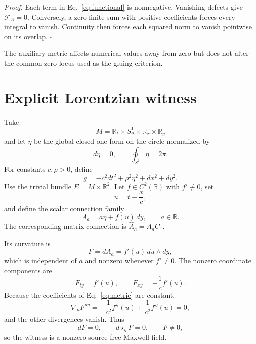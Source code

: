 \documentclass[aps,prd,reprint,nofootinbib,superscriptaddress]{revtex4-2}
\newcommand{\R}{\mathbb R}
\begin{document}
\emph{Proof.}
Each term in Eq.~\eqref{eq:functional} is nonnegative. Vanishing defects give $\mathcal F_{\Lambda}=0$. Conversely, a zero finite sum with positive coefficients forces every integral to vanish. Continuity then forces each squared norm to vanish pointwise on its overlap. \hfill$\square$

The auxiliary metric affects numerical values away from zero but does not alter the common zero locus used as the gluing criterion.

\section{Explicit Lorentzian witness}

Take
\begin{equation}
M=\R_t\times S^1_\vartheta\times\R_x\times\R_y
\label{eq:manifold}
\end{equation}
and let $\eta$ be the global closed one-form on the circle normalized by
\begin{equation}
d\eta=0,
\qquad
\oint_{S^1}\eta=2\pi.
\end{equation}
For constants $c,\rho>0$, define
\begin{equation}
g=-c^2dt^2+\rho^2\eta^2+dx^2+dy^2.
\label{eq:metric}
\end{equation}
Use the trivial bundle $E=M\times\R^2$. Let $f\in C^2(\R)$ with $f'\not\equiv0$, set
\begin{equation}
u=t-\frac{x}{c},
\end{equation}
and define the scalar connection family
\begin{equation}
\boxed{A_a=a\eta+f(u)\,dy,\qquad a\in\R.}
\label{eq:connection}
\end{equation}
The corresponding matrix connection is $\widehat A_a=A_aC_1$.

Its curvature is
\begin{equation}
\boxed{F=dA_a=f'(u)\,du\wedge dy,}
\label{eq:curvature}
\end{equation}
which is independent of $a$ and nonzero whenever $f'\neq0$. The nonzero coordinate components are
\begin{equation}
F_{ty}=f'(u),
\qquad
F_{xy}=-\frac1c f'(u).
\end{equation}
Because the coefficients of Eq.~\eqref{eq:metric} are constant,
\begin{equation}
\nabla_\mu F^{\mu y}
=-\frac1{c^2}f''(u)+\frac1{c^2}f''(u)=0,
\end{equation}
and the other divergences vanish. Thus
\begin{equation}
dF=0,
\qquad
d\star_gF=0,
\qquad
F\neq0,
\label{eq:maxwell}
\end{equation}
so the witness is a nonzero source-free Maxwell field.
\end{document}
